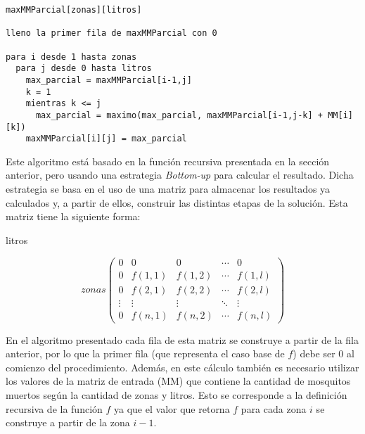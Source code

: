 \documentclass[a4paper,11pt] {article}
\begin{document}
\begin{verbatim}
maxMMParcial[zonas][litros]

lleno la primer fila de maxMMParcial con 0

para i desde 1 hasta zonas
  para j desde 0 hasta litros
    max_parcial = maxMMParcial[i-1,j]
    k = 1
    mientras k <= j
      max_parcial = maximo(max_parcial, maxMMParcial[i-1,j-k] + MM[i][k])
    maxMMParcial[i][j] = max_parcial

\end{verbatim}

% 


Este algoritmo est\'a basado en la funci\'on recursiva presentada en la secci\'on anterior, pero usando una estrategia \textit{Bottom-up} para calcular el resultado. Dicha estrategia se basa en el uso de una matriz para almacenar los resultados ya calculados y, a partir de ellos, construir las distintas etapas de la soluci\'on. Esta matriz tiene la siguiente forma:

\begin{center}
litros
\end{center}
\[ zonas \left( \begin{array}{ccccc}
0 & 0 & 0 & \cdots & 0 \\
0 & f(1,1) & f(1,2) & \cdots & f(1,l)  \\
0 & f(2,1) & f(2,2) & \cdots & f(2,l)	\\
\vdots & \vdots & \vdots & \ddots & \vdots \\
0 & f(n,1) & f(n,2) & \cdots & f(n,l) \end{array} \right)\]

En el algoritmo presentado cada fila de esta matriz se construye a partir de la fila anterior, por lo que la primer fila (que representa el caso base de $f$) debe ser 0 al comienzo del procedimiento. Adem\'as, en este c\'alculo tambi\'en es necesario utilizar los valores de la matriz de entrada (MM) que contiene la cantidad de mosquitos muertos seg\'un la cantidad de zonas y litros.
Esto se corresponde a la definici\'on recursiva de la funci\'on $f$ ya que el valor que retorna $f$ para cada zona $i$ se construye a partir de la zona $i-1$. 
\end{document}
